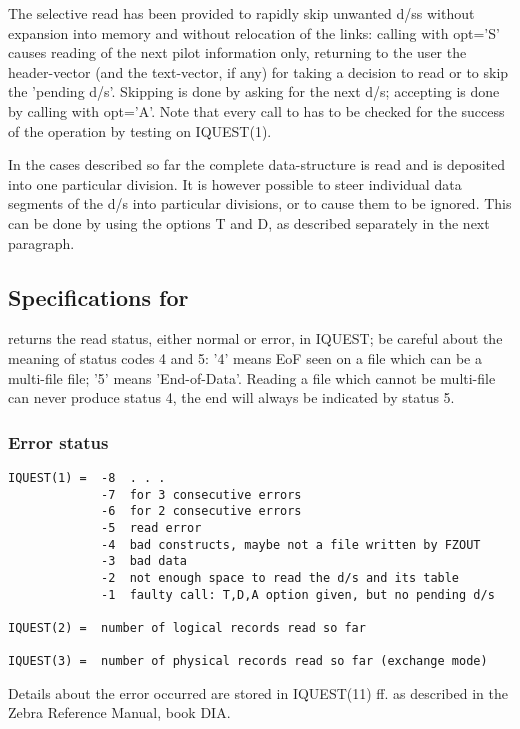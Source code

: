 {The selective read has been provided to rapidly skip unwanted
d/ss without expansion into memory and without relocation
of the links:
calling  with opt='S' causes reading of the next pilot
information only,
returning to the user the header-vector (and the text-vector, if any)
for taking a decision to read or to skip the 'pending d/s'.
Skipping is done by asking for the next d/s;
accepting is done by calling  with opt='A'.
Note that every call to  has to be checked for the success of
the operation by testing on IQUEST(1).

In the cases described so far the complete data-structure is
read and is deposited into one particular division.
It is however possible to steer individual data segments of
the d/s into particular divisions, or to cause them to be ignored.
This can be done by using the options T and D,
as described separately in the next paragraph.

\subsection*{Specifications for }

 returns the read status, either normal or error, in IQUEST;
be careful about the meaning of status codes 4 and 5:
'4' means EoF seen on a file which can be a multi-file file;
'5' means 'End-of-Data'.
Reading a file which cannot be multi-file can never
produce status 4, the end will always be indicated by status 5.

\subsubsection*{Error status}

\begin{verbatim}
IQUEST(1) =  -8  . . .
             -7  for 3 consecutive errors
             -6  for 2 consecutive errors
             -5  read error
             -4  bad constructs, maybe not a file written by FZOUT
             -3  bad data
             -2  not enough space to read the d/s and its table
             -1  faulty call: T,D,A option given, but no pending d/s

IQUEST(2) =  number of logical records read so far

IQUEST(3) =  number of physical records read so far (exchange mode)
\end{verbatim}
Details about the error occurred are stored in IQUEST(11) ff.
as described in the Zebra Reference Manual, book DIA.

}
